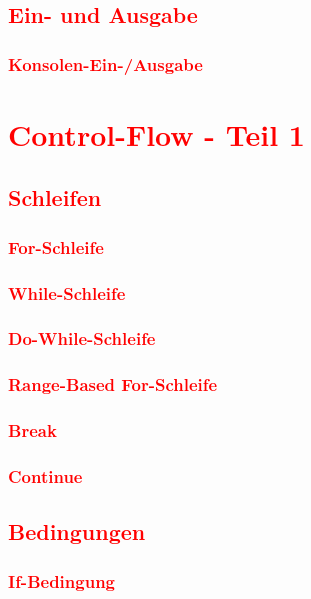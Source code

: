 \section{\textcolor{red}{Ein- und Ausgabe}}\label{sec:input-output}
\subsection{\textcolor{red}{Konsolen-Ein-/Ausgabe}}\label{sec:console-io}

\cleardoublepage\chapter{\textcolor{red}{Control-Flow - Teil 1}}\label{chap:control-flow-1}
\section{\textcolor{red}{Schleifen}}\label{sec:loops}
\subsection{\textcolor{red}{For-Schleife}}\label{sec:for-loop}
\subsection{\textcolor{red}{While-Schleife}}\label{sec:while-loop}
\subsection{\textcolor{red}{Do-While-Schleife}}\label{sec:do-while-loop}
\subsection{\textcolor{red}{Range-Based For-Schleife}}\label{sec:range-based-for-loop}
\subsection{\textcolor{red}{Break}}\label{sec:break}
\subsection{\textcolor{red}{Continue}}\label{sec:continue}
\section{\textcolor{red}{Bedingungen}}\label{sec:conditions}
\subsection{\textcolor{red}{If-Bedingung}}\label{sec:if-condition}
